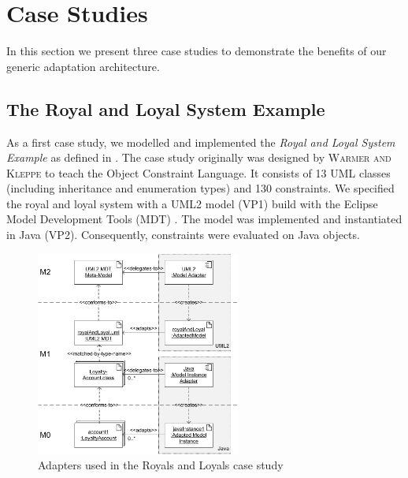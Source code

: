 \section{Case Studies}
\label{sec:caseStudies}
In this section we present three case studies to demonstrate the benefits of our
generic adaptation architecture.


\subsection{The Royal and Loyal System Example}

As a first case study, we modelled and implemented the \textit{Royal and Loyal System Example} 
as defined in \cite{warmer:ocl}. The case study originally was designed by \textsc{Warmer
and Kleppe} to teach the Object Constraint Language. It consists of
13 UML classes (including inheritance and enumeration types) and 130 constraints. 
We specified the royal and loyal system with a UML2 model (VP1) build with the
Eclipse Model Development Tools (MDT) \cite{WWW:MDT}.
The model was implemented and instantiated in Java (VP2). 
Consequently, constraints were evaluated on Java objects.

\begin{figure}[!t]
	\centering
		\includegraphics[width=0.60\textwidth]{figures/casestudy01.pdf}
	\caption{
	Adapters used in the Royals and Loyals case study
	  }
	\label{fig:casestudy01}
\end{figure}

